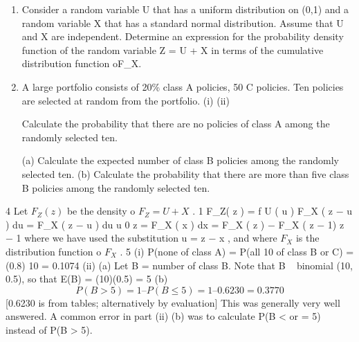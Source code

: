 \documentclass[a4paper,12pt]{article}
\begin{document}
\begin{enumerate}


\item 



Consider a random variable U that has a uniform distribution on (0,1) and a random variable X that has a standard normal distribution. Assume that U and X are independent.
Determine an expression for the probability density function of the random variable Z
= U + X in terms of the cumulative distribution function oF_X.

\item 
A large portfolio consists of 20\% class A policies, 50%
C policies. Ten policies are selected at random from the portfolio.
(i)
(ii)


Calculate the probability that there are no policies of class A among the
randomly selected ten.

(a) Calculate the expected number of class B policies among the randomly
selected ten.
(b) Calculate the probability that there are more than five class B policies
among the randomly selected ten.

\end{enumerate}
\newpage


4
Let $F_Z( z )$ be the density o $F_Z= U + X$ .
1
F_Z( z ) = \int f U ( u ) F_X ( z − u ) du = \int F_X ( z − u ) du
u
0
z
=
\int F_X ( x ) dx = F_X ( z ) − F_X ( z − 1)
z − 1
where we have used the substitution u = z − x , and where $F_X$ is the distribution
function o $F_X$ .
5
(i) P(none of class A) = P(all 10 of class B or C) = (0.8) 10 = 0.1074
(ii) (a)
Let B = number of class B.
Note that B ~ binomial (10, 0.5), so that E(B) = (10)(0.5) = 5
(b)
\[P(B > 5) = 1 – P( B \leq 5 ) = 1 – 0.6230 = 0.3770\]
[0.6230 is from tables; alternatively by evaluation]
This was generally very well answered. A common error in part (ii) (b) was to calculate
P(B < or = 5) instead of P(B > 5).
\end{document}

